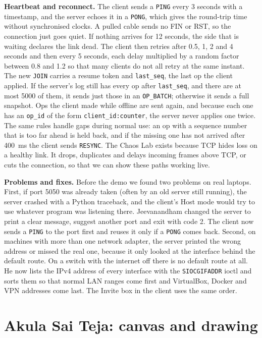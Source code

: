 \documentclass[11pt,a4paper]{article}
\begin{document}
\textbf{Heartbeat and reconnect.} The client sends a \texttt{PING} every 3 seconds with a
timestamp, and the server echoes it in a \texttt{PONG}, which gives the round-trip time without
synchronised clocks. A pulled cable sends no FIN or RST, so the connection just goes quiet. If
nothing arrives for 12 seconds, the side that is waiting declares the link dead. The client then
retries after 0.5, 1, 2 and 4 seconds and then every 5 seconds, each delay multiplied by a random
factor between 0.8 and 1.2 so that many clients do not all retry at the same instant. The new
\texttt{JOIN} carries a resume token and \texttt{last\_seq}, the last op the client applied. If
the server's log still has every op after \texttt{last\_seq}, and there are at most 5000 of them,
it sends just those in an \texttt{OP\_BATCH}; otherwise it sends a full snapshot. Ops the client
made while offline are sent again, and because each one has an \texttt{op\_id} of the form
\texttt{client\_id:counter}, the server never applies one twice. The same rules handle gaps
during normal use: an op with a sequence number that is too far ahead is held back, and if the
missing one has not arrived after 400~ms the client sends \texttt{RESYNC}. The Chaos Lab exists
because TCP hides loss on a healthy link. It drops, duplicates and delays incoming frames above
TCP, or cuts the connection, so that we can show these paths working live.

\textbf{Problems and fixes.} Before the demo we found two problems on real laptops. First, if port
5050 was already taken (often by an old server still running), the server crashed with a Python
traceback, and the client's Host mode would try to use whatever program was listening there.
Jeevanandham changed the server to print a clear message, suggest another port and exit with code
2. The client now sends a \texttt{PING} to the port first and reuses it only if a \texttt{PONG}
comes back. Second, on machines with more than one network adapter, the server printed the wrong
address or missed the real one, because it only looked at the interface behind the default
route. On a switch with the internet off there is no default route at all. He now lists the IPv4
address of every interface with the \texttt{SIOCGIFADDR} ioctl and sorts them so that normal LAN
ranges come first and VirtualBox, Docker and VPN addresses come last. The Invite box in the client
uses the same order.

\section{Akula Sai Teja: canvas and drawing}
\end{document}
